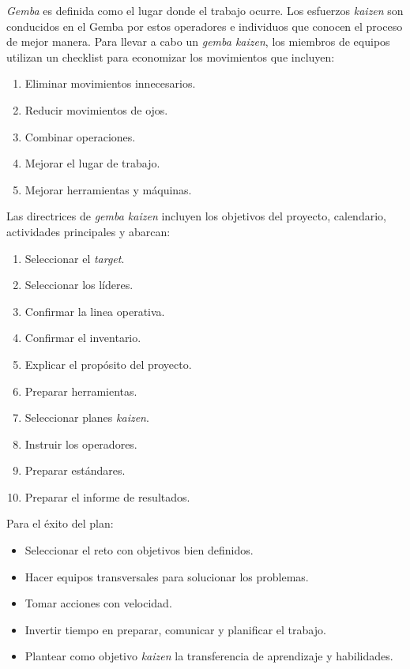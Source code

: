 \documentclass[oneside]{book}
\begin{document}
\textit{Gemba} es definida como el lugar donde el trabajo ocurre. Los esfuerzos \textit{kaizen} son conducidos en el Gemba por estos operadores e individuos que conocen el proceso de mejor manera. Para llevar a cabo un \textit{gemba kaizen}, los miembros de equipos utilizan un checklist para economizar los movimientos que incluyen:

\begin{enumerate}
	\item Eliminar movimientos innecesarios.
	\item Reducir movimientos de ojos.
	\item Combinar operaciones.
	\item Mejorar el lugar de trabajo.
	\item Mejorar herramientas y máquinas.
\end{enumerate}

Las directrices de \textit{gemba kaizen} incluyen los objetivos del proyecto, calendario, actividades principales y abarcan:
\begin{enumerate}
	\item Seleccionar el \textit{target}.
	\item Seleccionar los líderes.
	\item Confirmar la linea operativa.
	\item Confirmar el inventario.
	\item Explicar el propósito del proyecto.
	\item Preparar herramientas.
	\item Seleccionar planes \textit{kaizen}.
	\item Instruir los operadores.
	\item Preparar estándares.
	\item Preparar el informe de resultados.
\end{enumerate}

Para el éxito del plan:
\begin{itemize}
	\item Seleccionar el reto con objetivos bien definidos.
	\item Hacer equipos transversales para solucionar los problemas.
	\item Tomar acciones con velocidad.
	\item Invertir tiempo en preparar, comunicar y planificar el trabajo.
	\item Plantear como objetivo \textit{kaizen} la transferencia de aprendizaje y habilidades.
\end{itemize}
\end{document}
